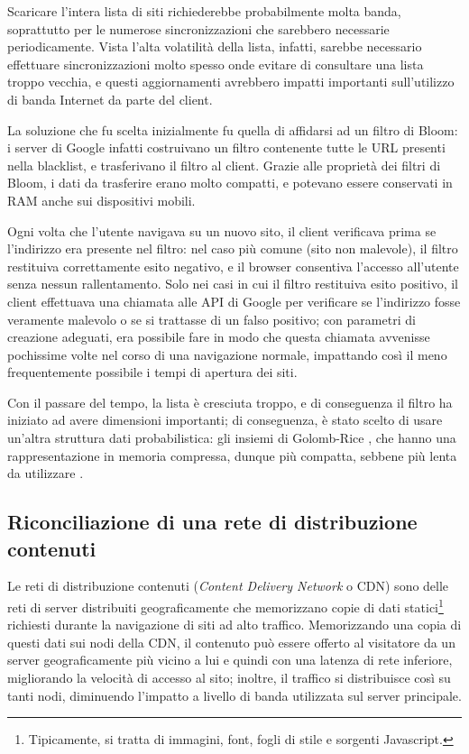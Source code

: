 Scaricare l'intera lista di siti richiederebbe probabilmente molta banda, soprattutto per le
numerose sincronizzazioni che sarebbero necessarie periodicamente. Vista l'alta volatilità della
lista, infatti, sarebbe necessario effettuare sincronizzazioni molto spesso onde evitare di
consultare una lista troppo vecchia, e questi aggiornamenti avrebbero impatti importanti
sull'utilizzo di banda Internet da parte del client.

La soluzione che fu scelta inizialmente fu quella di affidarsi ad un filtro di Bloom: i server
di Google infatti costruivano un filtro contenente tutte le URL presenti nella blacklist, e
trasferivano il filtro al client. Grazie alle proprietà dei filtri di Bloom, i dati da trasferire
erano molto compatti, e potevano essere conservati in RAM anche sui dispositivi mobili.

Ogni volta che l'utente navigava su un nuovo sito, il client verificava prima se l'indirizzo era
presente nel filtro: nel caso più comune (sito non malevole), il filtro restituiva correttamente
esito negativo, e il browser consentiva l'accesso all'utente senza nessun rallentamento. Solo nei
casi in cui il filtro restituiva esito positivo, il client effettuava una chiamata alle API di
Google per verificare se l'indirizzo fosse veramente malevolo o se si trattasse di un falso
positivo; con parametri di creazione adeguati, era possibile fare in modo che questa chiamata
avvenisse pochissime volte nel corso di una navigazione normale, impattando così il meno
frequentemente possibile i tempi di apertura dei siti.

Con il passare del tempo, la lista è cresciuta troppo, e di conseguenza il filtro ha iniziato ad
avere dimensioni importanti; di conseguenza, è stato scelto di usare un'altra struttura dati
probabilistica: gli insiemi di Golomb-Rice \cite{golomb,rice,golomb-rice}, che hanno una
rappresentazione in memoria compressa, dunque più compatta, sebbene più lenta da utilizzare
\cite{golomb-safebrowsing}.

\subsection{Riconciliazione di una rete di distribuzione con\-te\-nu\-ti}
\label{sec:bloomcdn}

Le reti di distribuzione contenuti (\emph{Content Delivery Network} o CDN) sono delle reti di server
distribuiti geograficamente che memorizzano copie di dati statici\footnote{Tipicamente, si tratta di
immagini, font, fogli di stile e sorgenti Javascript.} richiesti durante la navigazione di siti ad
alto traffico. Memorizzando una copia di questi dati sui nodi della CDN, il contenuto può
essere offerto al visitatore da un server geograficamente più vicino a lui e quindi con una latenza
di rete inferiore, migliorando la velocità di accesso al sito; inoltre, il traffico si distribuisce
così su tanti nodi, diminuendo l'impatto a livello di banda utilizzata sul server principale.


